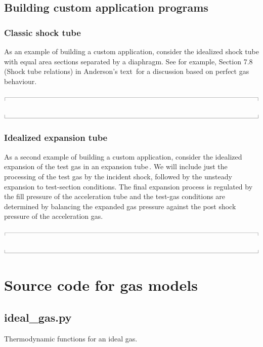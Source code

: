 \documentclass[10pt,a4paper]{article}
\newcommand{\topbar}{\ensuremath{
    \rule{0.1mm}{2.0mm} \rule[2.0mm]{159.5mm}{0.1mm} \rule{0.1mm}{2.0mm}
}}
\newcommand{\bottombar}{\ensuremath{
    \rule{0.1mm}{2.0mm} \rule{159.5mm}{0.1mm} \rule{0.1mm}{2.0mm}
}}
\begin{document}
\bigskip
\subsection{Building custom application programs}
\label{custom-apps}
%
\subsubsection*{Classic shock tube}
%
As an example of building a custom application, consider the idealized shock tube 
with equal area sections separated by a diaphragm.
See for example, Section 7.8 (Shock tube relations) in Anderson's text\,\cite{anderson_82}
for a discussion based on perfect gas behaviour.

\medskip
\noindent\topbar

\bottombar

\bigskip
\subsubsection*{Idealized expansion tube}
%
As a second example of building a custom application, consider the idealized expansion
of the test gas in an expansion tube\,\cite{trimpi_62}.
We will include just the processing of the test gas by the incident shock,
followed by the unsteady expansion to test-section conditions. 
The final expansion process is regulated by the fill pressure of the acceleration tube
and the test-gas conditions are determined by balancing the expanded gas pressure against
the post shock pressure of the acceleration gas.

\medskip
\noindent\topbar

\bottombar


\newpage




\newpage
\appendix
\section{Source code for gas models}
%
\subsection{ideal\_gas.py}
\label{ideal-gas-py}
%
Thermodynamic functions for an ideal gas.
\end{document}
